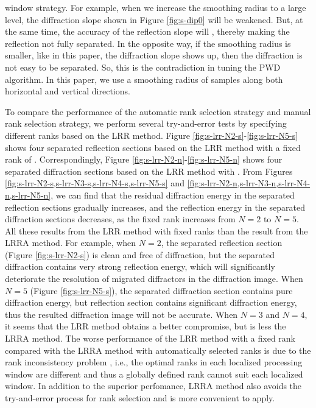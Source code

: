 window strategy. For example, when we increase the smoothing radius to a large level, the diffraction slope shown in Figure \ref{fig:s-dip0} will be weakened. But, at the same time, the accuracy of the reflection slope will , thereby making the reflection not fully separated. In the opposite way, if the smoothing radius is smaller, like in this paper, the diffraction slope shows up, then the diffraction is not easy to be separated. So, this is the contradiction in tuning the PWD algorithm. In this paper, we use a smoothing radius of  samples along both horizontal and vertical directions.


To compare the performance of the automatic rank selection strategy and manual rank selection strategy, we perform several try-and-error tests by specifying different ranks based on the LRR method. Figure \ref{fig:s-lrr-N2-s}-\ref{fig:s-lrr-N5-s} shows four separated reflection sections based on the LRR method with a fixed rank of . Correspondingly, Figure \ref{fig:s-lrr-N2-n}-\ref{fig:s-lrr-N5-n} shows four separated diffraction sections based on the LRR method with . From Figures \ref{fig:s-lrr-N2-s,s-lrr-N3-s,s-lrr-N4-s,s-lrr-N5-s} and \ref{fig:s-lrr-N2-n,s-lrr-N3-n,s-lrr-N4-n,s-lrr-N5-n}, we can find that the residual diffraction energy in the separated reflection sections gradually increases, and the reflection energy in the separated diffraction sections decreases, as the fixed rank increases from $N=2$ to $N=5$. All these results from the LRR method with fixed ranks  than the result from the LRRA method. For example, when $N=2$, the separated reflection section (Figure \ref{fig:s-lrr-N2-s}) is clean and free of diffraction, but the separated diffraction contains very strong reflection energy, which will significantly deteriorate the resolution of migrated diffractors in the diffraction image. When $N=5$ (Figure \ref{fig:s-lrr-N5-s}), the separated diffraction section contains pure diffraction energy, but  reflection section contains significant diffraction energy, thus the resulted diffraction image will not be accurate. When $N=3$ and $N=4$, it seems that the LRR method obtains a better compromise, but is less   the LRRA method. The worse performance of the LRR method with a fixed rank compared with the LRRA method with automatically selected ranks is due to the rank inconsistency problem \cite[]{shaohuan2017gji}, i.e., the optimal ranks in each localized processing window are different and thus a globally defined rank cannot suit each localized window. In addition to the superior perfomance, LRRA method also avoids the try-and-error process for rank selection and is more convenient to apply. 

